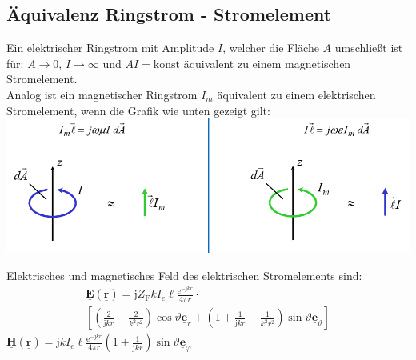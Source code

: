 \documentclass[english]{latex4ei/latex4ei_sheet}
\renewcommand{\vec}[1]{\underline{\boldsymbol{#1}}}
\begin{document}
\begin{sectionbox}
\subsection{Äquivalenz Ringstrom - Stromelement}
Ein elektrischer Ringstrom mit Amplitude $I$, welcher die Fläche $A$ umschließt ist für: $A\to 0$, $I \to \infty$ und $AI = \text{konst}$ äquivalent zu einem magnetischen Stromelement.\\
Analog ist ein magnetischer Ringstrom $I_m$ äquivalent zu einem elektrischen Stromelement, wenn die Grafik wie unten gezeigt gilt:\\
\includegraphics[width=\textwidth]{./img/antennen_ringstrom_zwei.png}
\end{sectionbox}

\begin{sectionbox}
	Elektrisches und magnetisches Feld des elektrischen Stromelements sind:
	\begin{multline*}
		\vec{E}(\vec{r})= \mathrm{j} Z_{\mathrm{F}} k I_{e} \ell \frac{\mathrm{e}^{-\mathrm{j} k r}}{4 \pi r} \cdot \\
		\left[\left(\frac{2}{\mathrm{j} k r}-\frac{2}{k^{2} r^{2}}\right) \cos \vartheta \vec{e}_{r}+\left(1+\frac{1}{\mathrm{j} k r}-\frac{1}{k^{2} r^{2}}\right) \sin \vartheta \vec{e}_{\vartheta}\right]
	\end{multline*}	
	$\vec{H}(\vec{r})=\mathrm{j} k I_{e} \ell \frac{\mathrm{e}^{-\mathrm{j} k r}}{4 \pi r}\left(1+\frac{1}{\mathrm{j} k r}\right) \sin \vartheta \vec{e}_{\varphi}$

\end{sectionbox}
\end{document}
